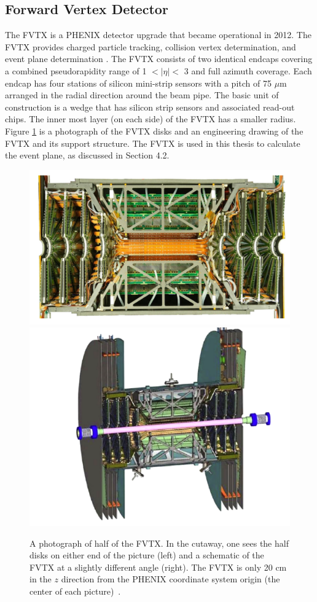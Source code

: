 \subsection{Forward Vertex Detector}
The FVTX is a PHENIX detector upgrade that became operational in 2012. The FVTX provides charged particle tracking, collision vertex determination, and event plane determination \cite{Aidala201444}. The FVTX consists of two identical endcaps covering a combined pseudorapidity range of 1 $<|\eta|<$ 3 and full azimuth coverage. Each endcap has four stations of silicon mini-strip sensors with a pitch of 75 $\mu$m arranged in the radial direction around the beam pipe. The basic unit of construction is a wedge that has silicon strip sensors and associated read-out chips. The inner most layer (on each side) of the FVTX has a smaller radius. Figure \ref{fig:fvtx_cutaway} is a photograph of the FVTX disks and an engineering drawing of the FVTX and its support structure. The FVTX is used in this thesis to calculate the event plane, as discussed in Section 4.2.
\begin{figure}[h!]
\centering
\includegraphics[width=0.45\linewidth]{figs/fvtx_cutaway.png}
\includegraphics[width=0.45\linewidth]{figs/fvtx_diagram.png}
\caption{A photograph of half of the FVTX. In the cutaway, one sees the half disks on either end of the picture (left) and a schematic of the FVTX at a slightly different angle (right). The FVTX is only 20 cm in the $z$ direction from the PHENIX coordinate system origin (the center of each picture)~\cite{Aidala201444}.}
\label{fig:fvtx_cutaway}
\end{figure}
